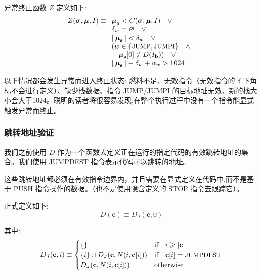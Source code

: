 \documentclass[9pt,oneside]{amsart}
\begin{document}
\begin{multicols}{2}
异常终止函数 $Z$ 定义如下:
\begin{equation}
Z(\boldsymbol{\sigma}, \boldsymbol{\mu}, I) \equiv
\begin{array}[t]{l}
\boldsymbol{\mu}_g < C(\boldsymbol{\sigma}, \boldsymbol{\mu}, I) \quad \vee \\
\mathbf{\delta}_w = \varnothing \quad \vee \\
\lVert\boldsymbol{\mu}_\mathbf{s}\rVert < \mathbf{\delta}_w \quad \vee \\
( w \in \{ \text{\small JUMP}, \text{\small JUMPI} \} \quad \wedge \\ \quad \boldsymbol{\mu}_\mathbf{s}[0] \notin D(I_\mathbf{b}) ) \quad \vee \\
\lVert\boldsymbol{\mu}_\mathbf{s}\rVert - \mathbf{\delta}_w + \mathbf{\alpha}_w > 1024 \quad
\end{array}
\end{equation}


以下情况都会发生异常而进入终止状态: 燃料不足、无效指令（无效指令的 $\delta$ 下角标不会进行定义）、缺少栈数据、指令 {\small JUMP}/{\small JUMPI} 的目标地址无效、新的栈大小会大于1024。聪明的读者将很容易发现,在整个执行过程中没有一个指令能显式触发异常而终止。


\subsubsection{跳转地址验证}

我们之前使用 $D$ 作为一个函数去定义正在运行的指定代码的有效跳转地址的集合。我们使用 JUMPDEST 指令表示代码可以跳转的地址。

这些跳转地址都必须在有效指令边界内，并且需要在显式定义在代码中,而不是基于 {\small PUSH} 指令操作的数据。（也不是使用隐含定义的 {\small STOP} 指令去跟踪它）。

正式定义如下:
\begin{equation}
D(\mathbf{c}) \equiv D_J(\mathbf{c}, 0)
\end{equation}

其中:
\begin{equation}
D_J(\mathbf{c}, i) \equiv \begin{cases}
\{\} & \text{if} \quad i \geqslant |\mathbf{c}|  \\
\{ i \} \cup D_J(\mathbf{c}, N(i, \mathbf{c}[i])) & \text{if} \quad \mathbf{c}[i] = \text{\small JUMPDEST} \\
D_J(\mathbf{c}, N(i, \mathbf{c}[i])) & \text{otherwise} \\
\end{cases}
\end{equation}


\end{multicols}
\end{document}
